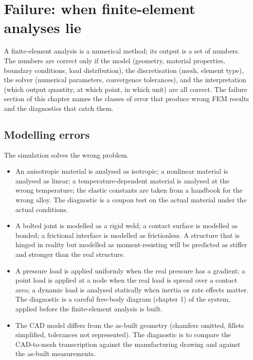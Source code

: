 \section{Failure: when finite-element analyses lie}

A finite-element analysis is a numerical method; its output is a
set of numbers. The numbers are correct only if the model
(geometry, material properties, boundary conditions, load
distribution), the discretisation (mesh, element type), the solver
(numerical parameters, convergence tolerances), and the
interpretation (which output quantity, at which point, in which
unit) are all correct. The failure section of this chapter names
the classes of error that produce wrong FEM results and the
diagnostics that catch them.

\subsection{Modelling errors}

The simulation solves the wrong problem.

\begin{itemize}[leftmargin=*]
  \item {} An anisotropic material is
    analysed as isotropic; a nonlinear material is analysed as
    linear; a temperature-dependent material is analysed at the
    wrong temperature; the elastic constants are taken from a
    handbook for the wrong alloy. The diagnostic is a coupon test
    on the actual material under the actual conditions.
  \item {} A bolted joint is
    modelled as a rigid weld; a contact surface is modelled as
    bonded; a frictional interface is modelled as frictionless. A
    structure that is hinged in reality but modelled as
    moment-resisting will be predicted as stiffer and stronger
    than the real structure.
  \item {} A pressure load is
    applied uniformly when the real pressure has a gradient; a
    point load is applied at a node when the real load is spread
    over a contact area; a dynamic load is analysed statically
    when inertia or rate effects matter. The diagnostic is a
    careful free-body diagram (chapter 1) of the system, applied
    before the finite-element analysis is built.
  \item {} The CAD model differs from the
    as-built geometry (chamfers omitted, fillets simplified,
    tolerances not represented). The diagnostic is to compare the
    CAD-to-mesh transcription against the manufacturing drawing
    and against the as-built measurements.
\end{itemize}

